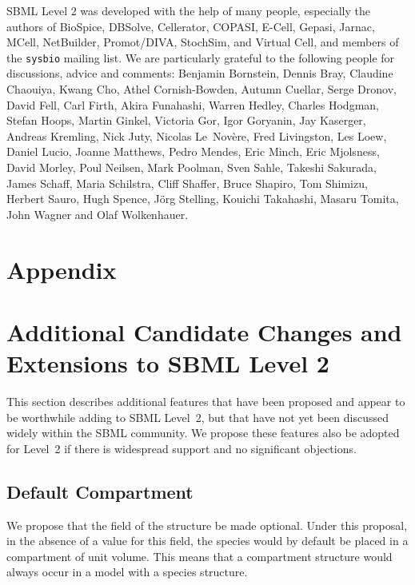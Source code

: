 \documentclass[10pt,twocolumntoc]{cekarticle}
\begin{document}
SBML Level 2 was developed with the help of many people, especially the
authors of BioSpice, DBSolve, Cellerator, COPASI, E-Cell, Gepasi, Jarnac,
MCell, NetBuilder, Promot/DIVA, StochSim, and Virtual Cell, and members of
the \texttt{sysbio} mailing list.  We are particularly grateful to the
following people for discussions, advice and comments: Benjamin Bornstein,
Dennis Bray, Claudine Chaouiya, Kwang Cho, Athel Cornish-Bowden, Autumn
Cuellar, Serge Dronov, David Fell, Carl Firth, Akira Funahashi, Warren
Hedley, Charles Hodgman, Stefan Hoops, Martin Ginkel, Victoria Gor, Igor
Goryanin, Jay Kaserger, Andreas Kremling, Nick Juty, Nicolas Le~Nov\`{e}re,
Fred Livingston, Les Loew, Daniel Lucio, Joanne Matthews, Pedro Mendes,
Eric Minch, Eric Mjolsness, David Morley, Poul Neilsen, Mark Poolman, Sven
Sahle, Takeshi Sakurada, James Schaff, Maria Schilstra, Cliff Shaffer,
Bruce Shapiro, Tom Shimizu, Herbert Sauro, Hugh Spence, J\"{o}rg Stelling,
Kouichi Takahashi, Masaru Tomita, John Wagner and Olaf Wolkenhauer.

\newpage
\section{Appendix}
\setcounter{secnumdepth}{2}
\appendix

\section{Additional Candidate Changes and Extensions to SBML Level 2}
\label{apdx:extensions}

This section describes additional features that have been proposed and
appear to be worthwhile adding to SBML Level~2, but that have not yet been
discussed widely within the SBML community.  We propose these features also
be adopted for Level~2 if there is widespread support and no significant
objections.


\subsection{Default Compartment}
\label{sec:defaultcompartment}

We propose that the  field of the 
structure be made optional.  Under this proposal, in the absence of a value
for this field, the species would by default be placed in a compartment
of unit volume.  This means that a compartment structure would always
occur in a model with a species structure.
\end{document}
